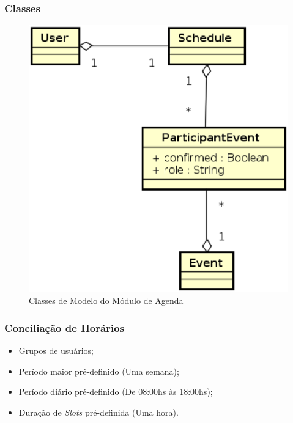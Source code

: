 \documentclass{beamer}
\begin{document}
\begin{frame}
\frametitle{Classes}

\begin{figure}[!h]
	\centering
	\includegraphics[scale=0.45]{figuras/modulo_agenda.eps}
	\caption{Classes de Modelo do Módulo de Agenda}
\end{figure}

\end{frame}

\begin{frame}
\frametitle{Conciliação de Horários}

\begin{itemize}
	\item Grupos de usuários;
	\item Período maior pré-definido (Uma semana);
	\item Período diário pré-definido (De 08:00hs às 18:00hs);
	\item Duração de \textit{Slots} pré-definida (Uma hora).
\end{itemize}

\end{frame}
\end{document}
